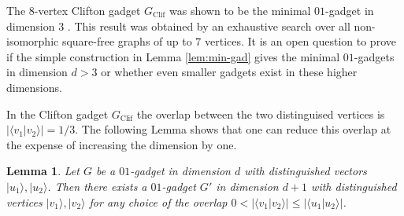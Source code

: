 \documentclass[twocolumn, a4paper, superscriptaddress,nofootinbib, accepted=2020-08-07, hyperref]{quantumarticle}
\newtheorem{lemma}{Lemma}
\begin{document}
The $8$-vertex Clifton gadget $G_{\text{Clif}}$ was shown to be the minimal $01$-gadget in dimension 3 \cite{Arends09}. This result was obtained by an exhaustive search over all non-isomorphic square-free graphs of up to $7$ vertices. 
It is an open question to prove if the simple construction in Lemma \ref{lem:min-gad} gives the minimal $01$-gadgets in dimension $d>3$ or whether even smaller gadgets exist in these higher dimensions. 

In the Clifton gadget $G_{\text{Clif}}$ the overlap between the two distinguised vertices is $|\langle v_1|v_2\rangle|=1/3$. The following Lemma shows that one can reduce this overlap at the expense of increasing the dimension by one. 
\begin{lemma}
	\label{lem:gad-realize}
	Let $G$ be a $01$-gadget in dimension $d$ with distinguished vectors $|u_1\rangle, |u_2\rangle$. Then there exists a $01$-gadget $G'$ in dimension $d+1$ with distinguished vertices $|v_1\rangle, |v_2\rangle$ for any choice of the overlap $0<|\langle v_1|v_2\rangle|\leq |\langle u_1|u_2\rangle|$.
\end{lemma}
\end{document}
